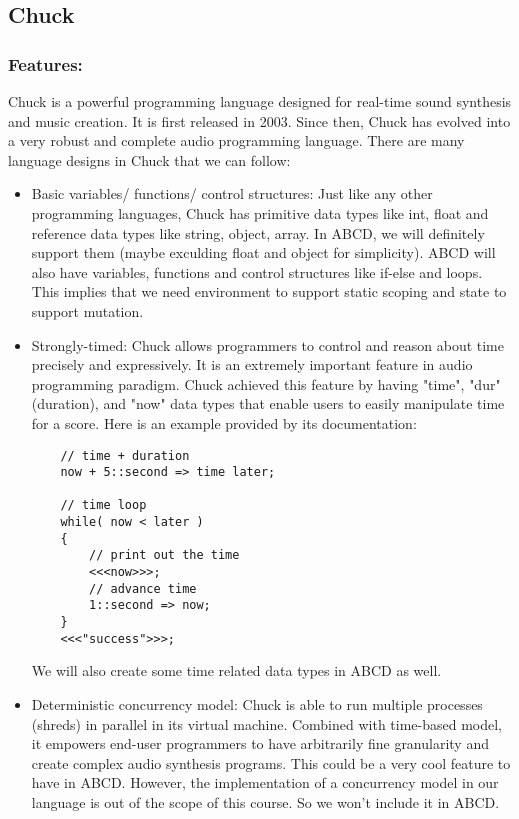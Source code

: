 \subsection{Chuck}

    \subsubsection{Features:}
    Chuck is a powerful programming language designed for real-time sound synthesis and music creation\cite{WangCook02}. It is first released in 2003\cite{Wang15}. Since then, Chuck has evolved into a very robust and complete audio programming language. There are many language designs in Chuck that we can follow:
    \begin{itemize}
    \item Basic variables/ functions/ control structures: Just like any other programming languages, Chuck has primitive data types like int, float and reference data types like string, object, array. In ABCD, we will definitely support them (maybe exculding float and object for simplicity). ABCD will also have variables, functions and control structures like if-else and loops. This implies that we need environment to support static scoping and state to support mutation.
    \item Strongly-timed: Chuck allows programmers to control and reason about time precisely and expressively. It is an extremely important feature in audio programming paradigm. Chuck achieved this feature by having "time", "dur"(duration), and "now" data types that enable users to easily manipulate time for a score. Here is an example provided by its documentation\cite{Wang15}:
    \begin{verbatim}
    // time + duration
    now + 5::second => time later;

    // time loop
    while( now < later )
    {
        // print out the time
        <<<now>>>;
        // advance time
        1::second => now;
    }
    <<<"success">>>;
    \end{verbatim}
    We will also create some time related data types in ABCD as well.
    \item Deterministic concurrency model: Chuck is able to run multiple processes (shreds) in parallel in its virtual machine\cite{Wang15}. Combined with time-based model, it empowers end-user programmers to have arbitrarily fine granularity and create complex audio synthesis programs. This could be a very cool feature to have in ABCD. However, the implementation of a concurrency model in our language is out of the scope of this course. So we won't include it in ABCD.
    \end{itemize}

